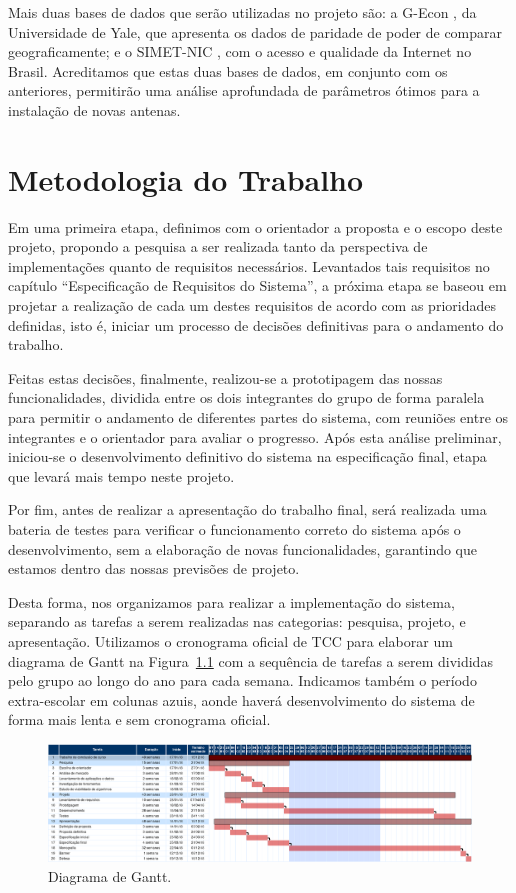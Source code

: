 \documentclass[]{politex}
\begin{document}
Mais duas bases de dados que serão utilizadas no projeto são: a G-Econ
\cite{gecon}, da Universidade de Yale, que apresenta os dados de paridade de
poder de comparar geograficamente; e o SIMET-NIC \cite{simet}, com o acesso e 
qualidade da Internet no Brasil. Acreditamos que estas duas bases de dados, em
conjunto com os anteriores, permitirão uma análise aprofundada de parâmetros
ótimos para a instalação de novas antenas.


\chapter{Metodologia do Trabalho}
Em uma primeira etapa, definimos com o orientador a proposta e o escopo deste
projeto, propondo a pesquisa a ser realizada tanto da perspectiva de
implementações quanto de requisitos necessários. Levantados tais requisitos no
capítulo ``Especificação de Requisitos do Sistema'', a próxima etapa se baseou
em projetar a realização de cada um destes requisitos de acordo com as
prioridades definidas, isto é, iniciar um processo de decisões definitivas para
o andamento do trabalho.

Feitas estas decisões, finalmente, realizou-se a prototipagem das nossas
funcionalidades, dividida entre os dois integrantes do grupo de forma paralela
para permitir o andamento de diferentes partes do sistema, com reuniões entre
os integrantes e o orientador para avaliar o progresso. Após esta análise
preliminar, iniciou-se o desenvolvimento definitivo do sistema na especificação
final, etapa que levará mais tempo neste projeto.

Por fim, antes de realizar a apresentação do trabalho final, será realizada uma
bateria de testes para verificar o funcionamento correto do sistema após o
desenvolvimento, sem a elaboração de novas funcionalidades, garantindo que
estamos dentro das nossas previsões de projeto.

Desta forma, nos organizamos para realizar a implementação do sistema, separando
as tarefas a serem realizadas nas categorias: pesquisa, projeto, e apresentação.
Utilizamos o cronograma oficial de TCC para elaborar um diagrama de Gantt na
Figura~\ref{fig:gantt} com a sequência de tarefas a serem divididas pelo grupo
ao longo do ano para cada semana. Indicamos também o período extra-escolar em
colunas azuis, aonde haverá desenvolvimento do sistema de forma mais lenta e
sem cronograma oficial.

\begin{figure}[H]
    \centering
    \includegraphics[width=6.5in]{imagens/diagrama_gantt}
    \caption{Diagrama de Gantt.}
    \label{fig:gantt}
  \end{figure}
\end{document}

